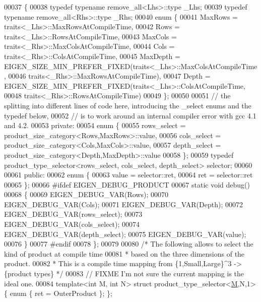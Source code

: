 \begin{DoxyCode}
00037 \{
00038   \textcolor{keyword}{typedef} \textcolor{keyword}{typename} remove\_all<Lhs>::type \_Lhs;
00039   \textcolor{keyword}{typedef} \textcolor{keyword}{typename} remove\_all<Rhs>::type \_Rhs;
00040   \textcolor{keyword}{enum} \{
00041     MaxRows = traits<\_Lhs>::MaxRowsAtCompileTime,
00042     Rows    = traits<\_Lhs>::RowsAtCompileTime,
00043     MaxCols = traits<\_Rhs>::MaxColsAtCompileTime,
00044     Cols    = traits<\_Rhs>::ColsAtCompileTime,
00045     MaxDepth = EIGEN\_SIZE\_MIN\_PREFER\_FIXED(traits<\_Lhs>::MaxColsAtCompileTime,
00046                                            traits<\_Rhs>::MaxRowsAtCompileTime),
00047     Depth = EIGEN\_SIZE\_MIN\_PREFER\_FIXED(traits<\_Lhs>::ColsAtCompileTime,
00048                                         traits<\_Rhs>::RowsAtCompileTime)
00049   \};
00050 
00051   \textcolor{comment}{// the splitting into different lines of code here, introducing the \_select enums and the typedef below,}
00052   \textcolor{comment}{// is to work around an internal compiler error with gcc 4.1 and 4.2.}
00053 \textcolor{keyword}{private}:
00054   \textcolor{keyword}{enum} \{
00055     rows\_select = product\_size\_category<Rows,MaxRows>::value,
00056     cols\_select = product\_size\_category<Cols,MaxCols>::value,
00057     depth\_select = product\_size\_category<Depth,MaxDepth>::value
00058   \};
00059   \textcolor{keyword}{typedef} product\_type\_selector<rows\_select, cols\_select, depth\_select> selector;
00060 
00061 \textcolor{keyword}{public}:
00062   \textcolor{keyword}{enum} \{
00063     value = selector::ret,
00064     ret = selector::ret
00065   \};
00066 \textcolor{preprocessor}{#ifdef EIGEN\_DEBUG\_PRODUCT}
00067   \textcolor{keyword}{static} \textcolor{keywordtype}{void} debug()
00068   \{
00069       EIGEN\_DEBUG\_VAR(Rows);
00070       EIGEN\_DEBUG\_VAR(Cols);
00071       EIGEN\_DEBUG\_VAR(Depth);
00072       EIGEN\_DEBUG\_VAR(rows\_select);
00073       EIGEN\_DEBUG\_VAR(cols\_select);
00074       EIGEN\_DEBUG\_VAR(depth\_select);
00075       EIGEN\_DEBUG\_VAR(value);
00076   \}
00077 \textcolor{preprocessor}{#endif}
00078 \};
00079 
00080 \textcolor{comment}{/* The following allows to select the kind of product at compile time}
00081 \textcolor{comment}{ * based on the three dimensions of the product.}
00082 \textcolor{comment}{ * This is a compile time mapping from \{1,Small,Large\}^3 -> \{product types\} */}
00083 \textcolor{comment}{// FIXME I'm not sure the current mapping is the ideal one.}
00084 \textcolor{keyword}{template}<\textcolor{keywordtype}{int} M, \textcolor{keywordtype}{int} N>  \textcolor{keyword}{struct }product\_type\_selector<\hyperlink{group___core___module_class_eigen_1_1_matrix}{M},N,1>              \{ \textcolor{keyword}{enum} \{ ret = OuterProduct \}; \};

\end{DoxyCode}

